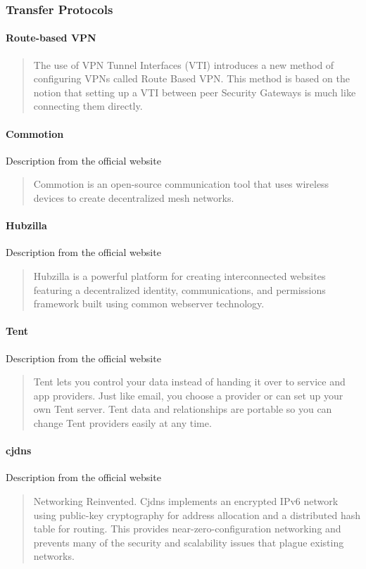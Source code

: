 
\subsubsection{Transfer Protocols}

\paragraph{Route-based VPN}
\cite{Point2014VPNR76}
\blockquote{The use of VPN Tunnel Interfaces (VTI) introduces a new method of configuring VPNs called Route Based VPN. This method is based on the notion that setting up a VTI between peer Security Gateways is much like connecting them directly.}

\paragraph{Commotion}
Description from the official website \cite{CommotionCommunityNetworks}
\blockquote{Commotion is an open-source communication tool that uses wireless devices to create decentralized mesh networks.}

\paragraph{Hubzilla}
Description from the official website \cite{HubzillaHubzilla}
\blockquote{Hubzilla is a powerful platform for creating interconnected websites featuring a decentralized identity, communications, and permissions framework built using common webserver technology.}

\paragraph{Tent}
Description from the official website \cite{Tent.is2013Tent.io}
\blockquote{Tent lets you control your data instead of handing it over to service and app providers. Just like email, you choose a provider or can set up your own Tent server. Tent data and relationships are portable so you can change Tent providers easily at any time.}

\paragraph{cjdns}
Description from the official website \cite{CjdnsCjdns}
\blockquote{Networking Reinvented. Cjdns implements an encrypted IPv6 network using public-key cryptography for address allocation and a distributed hash table for routing. This provides near-zero-configuration networking and prevents many of the security and scalability issues that plague existing networks.}

